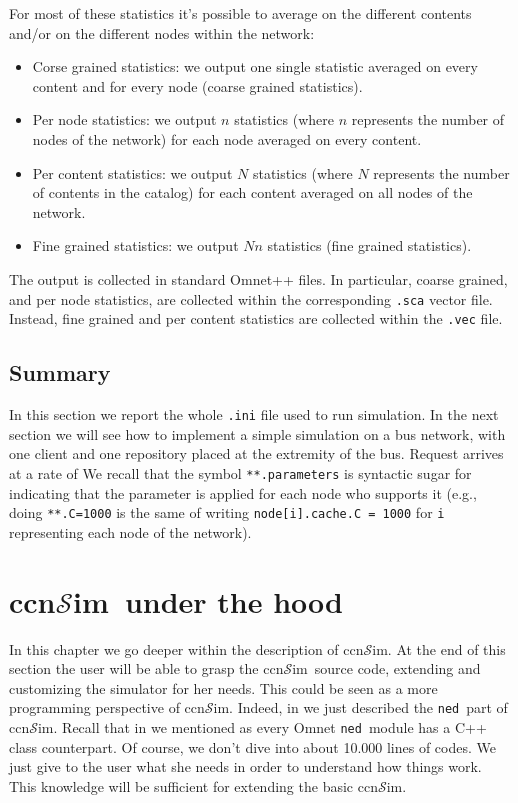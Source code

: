 \documentclass{book}
\newcommand{\ccnsim}{ccn$\mathcal{S}$im}
\newcommand{\ned}{\texttt{ned}}
\begin{document}
For most of these statistics it's possible to average on the different contents and/or on the different nodes within the network:
\begin{itemize}
    \item Corse grained statistics: we output one single statistic averaged on every content and for every node (coarse grained statistics).
    \item Per node statistics: we output $n$ statistics (where $n$ represents the number of nodes of the network) for each node averaged on every content.
    \item Per content statistics: we output $N$ statistics (where $N$ represents the number of contents in the catalog) for each content averaged on all nodes of the network.
    \item Fine grained statistics: we output $Nn$ statistics (fine grained statistics). 
\end{itemize}
The output is collected in standard Omnet++ files. In particular, coarse grained, and per node statistics, are collected within the corresponding \verb|.sca| vector file. Instead, fine grained and per content statistics are collected within the \verb|.vec| file. 

\section{Summary}
In this section we report the whole \verb|.ini| file used to run simulation. In the next section we will see how to implement a simple simulation on a bus network, with one client and one repository placed at the extremity of the bus. Request arrives at a rate of We recall that the symbol \verb|**.parameters| is syntactic sugar for indicating that the parameter is applied for each node who supports it (e.g., doing \verb|**.C=1000| is the same of writing \verb|node[i].cache.C = 1000| for \verb|i| representing each node of the network). 

\chapter{\ccnsim\ under the hood}\label{ch:hood}
In this chapter we go deeper within the description of \ccnsim. At the end of this section the user will be able to grasp the \ccnsim\ source code, extending and customizing the simulator for her needs. This could be seen as a more programming perspective of \ccnsim. Indeed, in  we just described the \ned\ part of \ccnsim. Recall that in  we mentioned as every Omnet \ned\ module has a C++ class counterpart. Of course, we don't dive into about 10.000 lines of codes. We just give to the user what she needs in order to understand how things work. This knowledge will be sufficient for extending the basic \ccnsim. 
\end{document}
